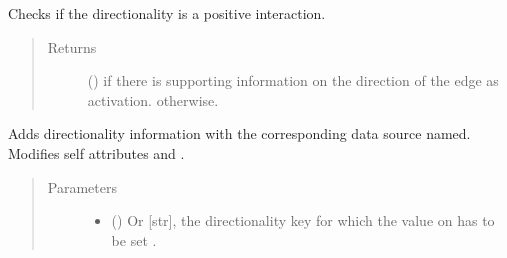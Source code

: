 \documentclass[letterpaper,10pt,english]{sphinxmanual}
\begin{document}
\begin{fulllineitems}
\begin{fulllineitems}
\begin{quote}
\begin{description}
\end{description}\end{quote}

\end{fulllineitems}


\begin{fulllineitems}
\label{\detokenize{reference:pypath.main.Direction.positive_straight}}
Checks if the  directionality is a positive
interaction.
\begin{quote}\begin{description}
\item[{Returns}] \leavevmode
() \textendash{}  if there is supporting information on
the  direction of the edge as activation.
 otherwise.

\end{description}\end{quote}

\end{fulllineitems}


\begin{fulllineitems}
\label{\detokenize{reference:pypath.main.Direction.set_dir}}
Adds directionality information with the corresponding data
source named. Modifies self attributes  and
.
\begin{quote}\begin{description}
\item[{Parameters}] \leavevmode\begin{itemize}
\item {} 
 () \textendash{} Or {[}str{]}, the directionality key for which the value on
 has to be set .


\end{itemize}
\end{description}
\end{quote}
\end{fulllineitems}
\end{fulllineitems}
\end{document}
